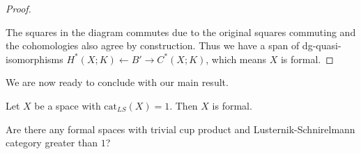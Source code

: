 \begin{proof}
\begin{center}
        \end{center}

    The squares in the diagram commutes due to the original squares commuting
    and the cohomologies also agree by construction. Thus we have a span of 
    dg-quasi-isomorphisms $H^\ast(X;K)\longleftarrow B'\longrightarrow C^\ast(X;K)$, 
    which means $X$ is formal. 
\end{proof}

We are now ready to conclude with our main result.
\begin{theorem}
    Let $X$ be a space with $\text{cat}_{LS}(X)=1$. Then $X$ is formal.     
\end{theorem}

\begin{question}
    Are there any formal spaces with trivial cup product and Lusternik-Schnirelmann 
    category greater than $1$? 
\end{question}